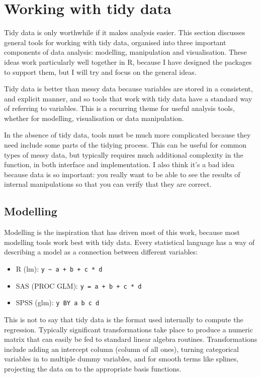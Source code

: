 \documentclass[oneside]{article}
\begin{document}
\section{Working with tidy data}

Tidy data is only worthwhile if it makes analysis easier. This section discusses general tools for working with tidy data, organised into three important components of data analysis: modelling, manipulation and visualisation. These ideas work particularly well together in R, because I have designed the packages to support them, but I will try and focus on the general ideas.

Tidy data is better than messy data because variables are stored in a consistent, and explicit manner, and so tools that work with tidy data have a standard way of referring to variables.  This is a recurring theme for useful analysis tools, whether for modelling, visualisation or data manipulation.

In the absence of tidy data, tools must be much more complicated because they need include some parts of the tidying process. This can be useful for common types of messy data, but typically requires much additional complexity in the function, in both interface and implementation. I also think it's a bad idea because data is so important: you really want to be able to see the results of internal manipulations so that you can verify that they are correct. 

\subsection{Modelling}

Modelling is the inspiration that has driven most of this work, because most modelling tools work best with tidy data. Every statistical language has a way of describing a model as a connection between different variables:   

\begin{itemize}
  \item R (lm): \verb|y ~ a + b + c * d|
  \item SAS (PROC GLM): \verb|y = a + b + c * d|
  \item SPSS (glm): \verb|y BY a b c d |
\end{itemize}

This is not to say that tidy data is the format used internally to compute the regression. Typically significant transformations take place to produce a numeric matrix that can easily be fed to standard linear algebra routines.  Transformations include adding an intercept column (column of all ones), turning categorical variables in to multiple dummy variables, and for smooth terms like splines, projecting the data on to the appropriate basis functions.
\end{document}
